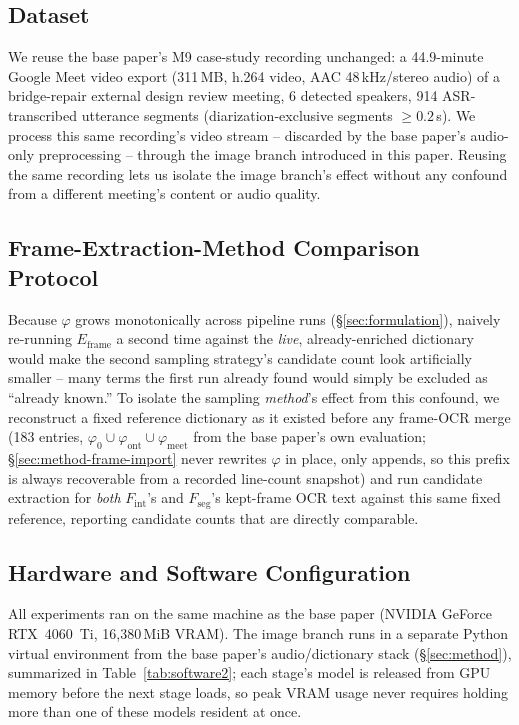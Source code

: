 ﻿\documentclass[twocolumn]{article}
\begin{document}
\subsection{Dataset}

We reuse the base paper's M9 case-study recording unchanged: a 44.9-minute Google Meet video export
(311\,MB, h.264 video, AAC 48\,kHz/stereo audio) of a bridge-repair external design review meeting,
6 detected speakers, 914 ASR-transcribed utterance segments (diarization-exclusive segments
$\geq 0.2$\,s). We process this same recording's video stream -- discarded by the base paper's
audio-only preprocessing -- through the image branch introduced in this paper. Reusing the same
recording lets us isolate the image branch's effect without any confound from a different
meeting's content or audio quality.

\subsection{Frame-Extraction-Method Comparison Protocol}
\label{sec:setup-protocol}

Because $\varphi$ grows monotonically across pipeline runs (\S\ref{sec:formulation}), naively
re-running $E_{\text{frame}}$ a second time against the \emph{live}, already-enriched dictionary
would make the second sampling strategy's candidate count look artificially smaller -- many terms
the first run already found would simply be excluded as ``already known.'' To isolate the sampling
\emph{method}'s effect from this confound, we reconstruct a fixed reference dictionary as it existed
before any frame-OCR merge (183 entries, $\varphi_0 \cup \varphi_{\text{ont}} \cup
\varphi_{\text{meet}}$ from the base paper's own evaluation; \S\ref{sec:method-frame-import} never
rewrites $\varphi$ in place, only appends, so this prefix is always recoverable from a recorded
line-count snapshot) and run candidate extraction for \emph{both} $F_{\text{int}}$'s and
$F_{\text{seg}}$'s kept-frame OCR text against this same fixed reference, reporting candidate counts
that are directly comparable.

\subsection{Hardware and Software Configuration}

All experiments ran on the same machine as the base paper (NVIDIA GeForce RTX~4060~Ti, 16{,}380\,MiB
VRAM). The image branch runs in a separate Python virtual environment from the base paper's
audio/dictionary stack (\S\ref{sec:method}), summarized in Table~\ref{tab:software2}; each
stage's model is released from GPU memory before the next stage loads, so peak VRAM usage never
requires holding more than one of these models resident at once.
\end{document}
